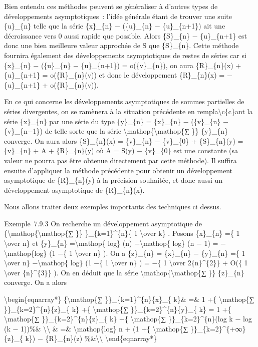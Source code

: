 \documentclass[]{article}
\begin{document}
Bien entendu ces méthodes peuvent se généraliser à d'autres types de
développements asymptotiques~: l'idée générale étant de trouver une
suite \{u\}\_\{n\} telle que la série \{x\}\_\{n\} − (\{u\}\_\{n\} −
\{u\}\_\{n+1\}) ait une décroissance vers 0 aussi rapide que possible.
Alors \{S\}\_\{n\} − \{u\}\_\{n+1\} est donc une bien meilleure valeur
approchée de S que \{S\}\_\{n\}. Cette méthode fournira également des
développements asymptotiques de restes de séries car si \{x\}\_\{n\} −
(\{u\}\_\{n\} − \{u\}\_\{n+1\}) = o(\{v\}\_\{n\}), on aura
\{R\}\_\{n\}(x) + \{u\}\_\{n+1\} = o(\{R\}\_\{n\}(v)) et donc le
développement \{R\}\_\{n\}(x) = −\{u\}\_\{n+1\} + o(\{R\}\_\{n\}(v)).

En ce qui concerne les développements asymptotiques de sommes partielles
de séries divergentes, on se ramènera à la situation précédente en
rempla\textbackslash{}c\{c\}ant la série \{x\}\_\{n\} par une série du
type \{y\}\_\{n\} = \{x\}\_\{n\} − (\{v\}\_\{n\} − \{v\}\_\{n−1\}) de
telle sorte que la série
\textbackslash{}mathop\{\textbackslash{}mathop\{∑ \}\} \{y\}\_\{n\}
converge. On aura alors \{S\}\_\{n\}(x) = \{v\}\_\{n\} − \{v\}\_\{0\} +
\{S\}\_\{n\}(y) = \{v\}\_\{n\} + A + \{R\}\_\{n\}(y) où A = S(y) −
\{v\}\_\{0\} est une constante (sa valeur ne pourra pas être obtenue
directement par cette méthode). Il suffira ensuite d'appliquer la
méthode précédente pour obtenir un développement asymptotique de
\{R\}\_\{n\}(y) à la précision souhaitée, et donc aussi un développement
asymptotique de \{R\}\_\{n\}(x).

Nous allons traiter deux exemples importants des techniques ci dessus.

Exemple~7.9.3 On recherche un développement asymptotique de
\{\textbackslash{}mathop\{\textbackslash{}mathop\{∑ \}\}
\}\_\{k=1\}\^{}\{n\}\{ 1 \textbackslash{}over k\} . Posons \{x\}\_\{n\}
=\{ 1 \textbackslash{}over n\} et \{y\}\_\{n\} =\textbackslash{}mathop\{
log\} (n) −\textbackslash{}mathop\{ log\} (n − 1) =
−\textbackslash{}mathop\{log\} (1 −\{ 1 \textbackslash{}over n\} ). On a
\{z\}\_\{n\} = \{x\}\_\{n\} − \{y\}\_\{n\} =\{ 1 \textbackslash{}over
n\} −\textbackslash{}mathop\{ log\} (1 −\{ 1 \textbackslash{}over n\} )
= −\{ 1 \textbackslash{}over 2\{n\}\^{}\{2\}\} + O(\{ 1
\textbackslash{}over \{n\}\^{}\{3\}\} ). On en déduit que la série
\textbackslash{}mathop\{\textbackslash{}mathop\{∑ \}\} \{z\}\_\{n\}
converge. On a alors

\textbackslash{}begin\{eqnarray*\} \{\textbackslash{}mathop\{∑
\}\}\_\{k=1\}\^{}\{n\}\{x\}\_\{ k\}\& =\& 1 +\{
\textbackslash{}mathop\{∑ \}\}\_\{k=2\}\^{}\{n\}\{z\}\_\{ k\} +\{
\textbackslash{}mathop\{∑ \}\}\_\{k=2\}\^{}\{n\}\{y\}\_\{ k\} = 1 +\{
\textbackslash{}mathop\{∑ \}\}\_\{k=2\}\^{}\{n\}\{z\}\_\{ k\} +\{
\textbackslash{}mathop\{∑ \}\}\_\{k=2\}\^{}\{n\}(log k − log (k −
1))\%\& \textbackslash{}\textbackslash{} \& =\&
\textbackslash{}mathop\{log\} n + (1 +\{ \textbackslash{}mathop\{∑
\}\}\_\{k=2\}\^{}\{+∞\}\{z\}\_\{ k\}) − \{R\}\_\{n\}(z)
\%\&\textbackslash{}\textbackslash{} \textbackslash{}end\{eqnarray*\}
\end{document}
